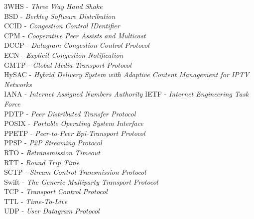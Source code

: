 3WHS		- \textit{Three Way Hand Shake}\\
BSD		- \textit{Berkley Software Distribution}\\
CCID		- \textit{Congestion Control IDentifier}\\
CPM		- \textit{Cooperative Peer Assists and Multicast}\\
DCCP		- \textit{Datagram Congestion Control Protocol}\\
ECN		- \textit{Explicit Congestion Notification}\\
GMTP		- \textit{Global Media Transport Protocol}\\
HySAC		- \textit{Hybrid Delivery System with Adaptive Content Management
for IPTV Networks}\\
IANA		- \textit{Internet Assigned Numbers Authority}
IETF		- \textit{Internet Engineering Task Force}\\
PDTP		- \textit{Peer Distributed Transfer Protocol}\\
POSIX		- \textit{Portable Operating System Interface}\\
PPETP		- \textit{Peer-to-Peer Epi-Transport Protocol}\\
PPSP		- \textit{P2P Streaming Protocol}\\
RTO		- \textit{Retransmission Timeout}\\
RTT		- \textit{Round Trip Time}\\
SCTP		- \textit{Stream Control Transmission Protocol}\\
Swift		- \textit{The Generic Multiparty Transport Protocol}\\
TCP		- \textit{Transport Control Protocol}\\
TTL		- \textit{Time-To-Live}\\
UDP		- \textit{User Datagram Protocol}\\